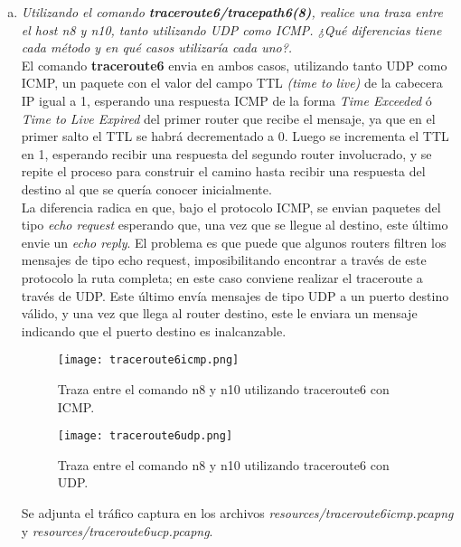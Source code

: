 \documentclass[osajnl,twocolumn,showpacs,superscriptaddress,10pt]{revtex4-1} %
\begin{document}
\begin{enumerate}[a)]
    \item \textit{Utilizando el comando \textbf{traceroute6/tracepath6(8)}, realice una
    traza entre el host n8 y n10, tanto utilizando UDP como ICMP.
    ¿Qué diferencias tiene cada método y en qué casos utilizaría cada
    uno?.} \\

    El comando \textbf{traceroute6} envia en ambos casos, utilizando tanto UDP como ICMP,
    un paquete con el valor del campo TTL \textit{(time to live)} de la cabecera IP igual a 1,
    esperando una respuesta ICMP de la forma \textit{Time Exceeded} ó \textit{Time to Live Expired} del primer router que recibe
    el mensaje, ya que en el primer salto el TTL se habrá decrementado a 0. Luego se incrementa el TTL en 1, 
    esperando recibir una respuesta del segundo router involucrado, y se repite el proceso para construir el camino hasta 
    recibir una respuesta del destino al que se quería conocer inicialmente. \\

    La diferencia radica en que, bajo el protocolo ICMP, se envian paquetes del tipo \textit{echo request} esperando que, 
    una vez que se llegue al destino, este último envie un \textit{echo reply}. El problema es que puede que algunos 
    routers filtren los mensajes de tipo echo request, imposibilitando encontrar a través de este protocolo la ruta completa; 
    en este caso conviene realizar el traceroute a través de UDP. Este último envía mensajes de tipo UDP a un puerto destino 
    válido, y una vez que llega al router destino, este le enviara un mensaje indicando que el puerto destino es inalcanzable.

    \begin{figure}[H]
        \centering
        \texttt{[image: traceroute6icmp.png]}
        \caption{Traza entre el comando n8 y n10 utilizando traceroute6 con ICMP.}
        \label{image:traceroute6icmp}
    \end{figure}

    \begin{figure}[H]
        \centering
        \texttt{[image: traceroute6udp.png]}
        \caption{Traza entre el comando n8 y n10 utilizando traceroute6 con UDP.}
        \label{image:traceroute6udp}
    \end{figure}

    Se adjunta el tráfico captura en los archivos \textit{resources/traceroute6icmp.pcapng} y \textit{resources/traceroute6ucp.pcapng}. \\


\end{enumerate}
\end{document}
